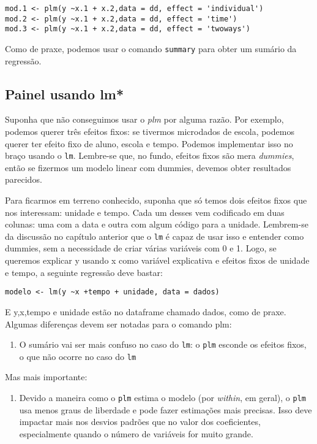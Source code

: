 \documentclass[]{book}
\providecommand{\tightlist}{%
  \setlength{\itemsep}{0pt}\setlength{\parskip}{0pt}}
\begin{document}
\begin{verbatim}
mod.1 <- plm(y ~x.1 + x.2,data = dd, effect = 'individual')
mod.2 <- plm(y ~x.1 + x.2,data = dd, effect = 'time')
mod.3 <- plm(y ~x.1 + x.2,data = dd, effect = 'twoways')
\end{verbatim}

Como de praxe, podemos usar o comando \texttt{summary} para obter um
sumário da regressão.

\subsection{Painel usando lm*}\label{painel-usando-lm}

Suponha que não conseguimos usar o \emph{plm} por alguma razão. Por
exemplo, podemos querer três efeitos fixos: se tivermos microdados de
escola, podemos querer ter efeito fixo de aluno, escola e tempo. Podemos
implementar isso no braço usando o \texttt{lm}. Lembre-se que, no fundo,
efeitos fixos são mera \emph{dummies}, então se fizermos um modelo
linear com dummies, devemos obter resultados parecidos.

Para ficarmos em terreno conhecido, suponha que só temos dois efeitos
fixos que nos interessam: unidade e tempo. Cada um desses vem codificado
em duas colunas: uma com a data e outra com algum código para a unidade.
Lembrem-se da discussão no capítulo anterior que o \texttt{lm} é capaz
de usar isso e entender como dummies, sem a necessidade de criar várias
variáveis com 0 e 1. Logo, se queremos explicar y usando x como variável
explicativa e efeitos fixos de unidade e tempo, a seguinte regressão
deve bastar:

\begin{verbatim}
modelo <- lm(y ~x +tempo + unidade, data = dados)
\end{verbatim}

E y,x,tempo e unidade estão no dataframe chamado dados, como de praxe.
Algumas diferenças devem ser notadas para o comando plm:

\begin{enumerate}
\def\labelenumi{(\arabic{enumi})}
\tightlist
\item
  O sumário vai ser mais confuso no caso do \texttt{lm}: o \texttt{plm}
  esconde os efeitos fixos, o que não ocorre no caso do \texttt{lm}
\end{enumerate}

Mas mais importante:

\begin{enumerate}
\def\labelenumi{(\arabic{enumi})}
\setcounter{enumi}{1}
\tightlist
\item
  Devido a maneira como o \texttt{plm} estima o modelo (por
  \emph{within}, em geral), o \texttt{plm} usa menos graus de liberdade
  e pode fazer estimações mais precisas. Isso deve impactar mais nos
  desvios padrões que no valor dos coeficientes, especialmente quando o
  número de variáveis for muito grande.
\end{enumerate}
\end{document}
